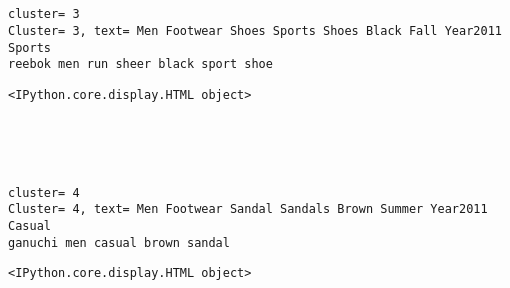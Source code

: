 \documentclass[11pt]{article}
\begin{document}
    
    \begin{center}
    \end{center}
    { \hspace*{\fill} \\}
    
    \begin{center}
    \end{center}
    { \hspace*{\fill} \\}
    
    \begin{Verbatim}[commandchars=\\\{\}]
cluster= 3
Cluster= 3, text= Men Footwear Shoes Sports Shoes Black Fall Year2011 Sports
reebok men run sheer black sport shoe
    \end{Verbatim}

    
    \begin{Verbatim}[commandchars=\\\{\}]
<IPython.core.display.HTML object>
    \end{Verbatim}

    
    \begin{center}
    \end{center}
    { \hspace*{\fill} \\}
    
    \begin{center}
    \end{center}
    { \hspace*{\fill} \\}
    
    \begin{Verbatim}[commandchars=\\\{\}]
cluster= 4
Cluster= 4, text= Men Footwear Sandal Sandals Brown Summer Year2011 Casual
ganuchi men casual brown sandal
    \end{Verbatim}

    
    \begin{Verbatim}[commandchars=\\\{\}]
<IPython.core.display.HTML object>
    \end{Verbatim}
\end{document}
